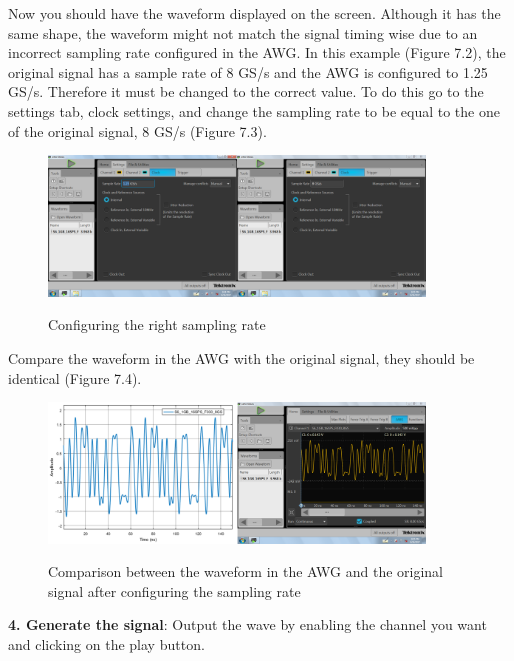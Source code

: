 Now you should have the waveform displayed on the screen. Although it has the same shape,  the waveform might not match the signal timing wise due to an incorrect sampling rate  configured in the AWG.
In this example (Figure 7.2), the original signal has a sample rate of 8 GS/s and the AWG is configured to 1.25 GS/s. Therefore it must be changed to the correct value.
To do this go to the settings tab, clock settings, and change the sampling rate to be equal to the one of the original signal, 8 GS/s (Figure 7.3).
\begin{figure}[h]
	\centering
	\includegraphics[width=10cm]{../mtools/sgnToWfm/figures/tutorial3}
	\label{TUT_ConfigSR}\caption{Configuring the right sampling rate}
\end{figure}
Compare the waveform in the AWG with the original signal, they should be identical (Figure 7.4).
\begin{figure}[h]
	\centering
	\includegraphics[width=10cm]{../mtools/sgnToWfm/figures/tutorial4}
	\label{TUT_CompGood}\caption{Comparison between the waveform in the AWG and the original signal after configuring the sampling rate}
\end{figure}
\bigskip

\noindent
\textbf{4. Generate the signal}:
Output the wave by enabling the channel you want and clicking on the play button.


% 
